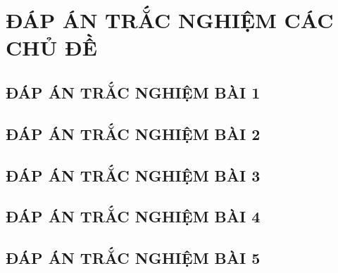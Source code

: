 \section*{ĐÁP ÁN TRẮC NGHIỆM CÁC CHỦ ĐỀ}
\subsection{ĐÁP ÁN TRẮC NGHIỆM BÀI 1}
	
\subsection{ĐÁP ÁN TRẮC NGHIỆM BÀI 2}
	
\subsection{ĐÁP ÁN TRẮC NGHIỆM BÀI 3}
	
\subsection{ĐÁP ÁN TRẮC NGHIỆM BÀI 4}
	
\subsection{ĐÁP ÁN TRẮC NGHIỆM BÀI 5}

